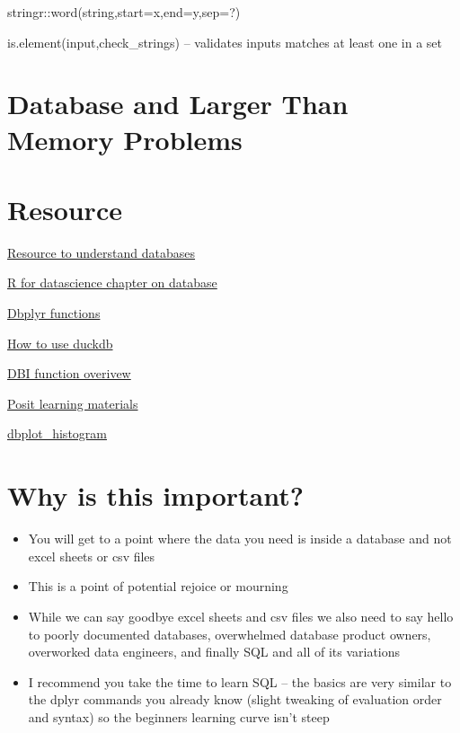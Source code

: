 \documentclass[
  letterpaper,
  DIV=11,
  numbers=noendperiod]{scrreprt}
\begin{document}
stringr::word(string,start=x,end=y,sep=?)

is.element(input,check\_strings) -- validates inputs matches at least
one in a set

\chapter{Database and Larger Than Memory
Problems}\label{database-and-larger-than-memory-problems}

\chapter{Resource}\label{resource}

\href{https://smithjd.github.io/sql-pet/chapter-setup-adventureworks-db.html\#}{Resource
to understand databases}

\href{https://r4ds.hadley.nz/databases.html}{R for datascience chapter
on database}

\href{https://dbplyr.tidyverse.org/articles/translation-function.html}{Dbplyr
functions}

\href{https://bwlewis.github.io/duckdb_and_r/talk/talk.html}{How to use
duckdb}

\href{https://dbi.r-dbi.org/}{DBI function overivew}

\href{https://solutions.posit.co/connections/db/}{Posit learning
materials}

\href{https://edgararuiz.github.io/dbplot/}{dbplot\_histogram}

\chapter{Why is this important?}\label{why-is-this-important}

\begin{itemize}
\item
  You will get to a point where the data you need is inside a database
  and not excel sheets or csv files
\item
  This is a point of potential rejoice or mourning
\item
  While we can say goodbye excel sheets and csv files we also need to
  say hello to poorly documented databases, overwhelmed database product
  owners, overworked data engineers, and finally SQL and all of its
  variations
\item
  I recommend you take the time to learn SQL -- the basics are very
  similar to the dplyr commands you already know (slight tweaking of
  evaluation order and syntax) so the beginners learning curve isn't
  steep
\end{itemize}
\end{document}

